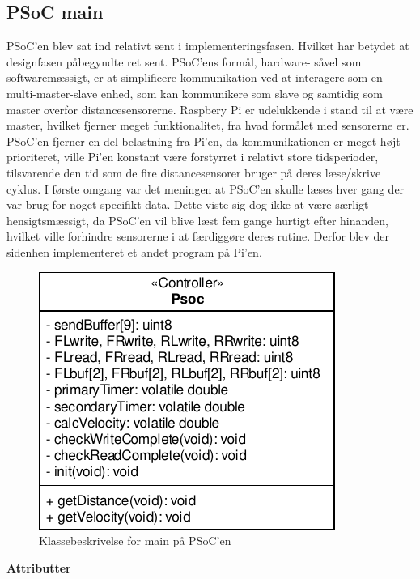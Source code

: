 \subsection{PSoC main} \label{sub:psoc_main}

PSoC'en blev sat ind relativt sent i implementeringsfasen. Hvilket har betydet at designfasen påbegyndte ret sent.
PSoC'ens formål, hardware- såvel som softwaremæssigt, er at simplificere \IIC kommunikation ved at interagere som en multi-master-slave enhed, som kan kommunikere som \IIC slave og samtidig som \IIC master overfor distancesensorerne. Raspbery Pi er udelukkende i stand til at være master, hvilket fjerner meget funktionalitet, fra hvad formålet med sensorerne er. PSoC'en fjerner en del belastning fra Pi'en, da \IIC kommunikationen er meget højt prioriteret, ville Pi'en konstant være forstyrret i relativt store tidsperioder, tilsvarende den tid som de fire distancesensorer bruger på deres læse/skrive cyklus. I første omgang var det meningen at PSoC'en skulle læses hver gang der var brug for noget specifikt data. Dette viste sig dog ikke at være særligt hensigtsmæssigt, da PSoC'en vil blive læst fem gange hurtigt efter hinanden, hvilket ville forhindre sensorerne i at færdiggøre deres rutine. Derfor blev der sidenhen implementeret et andet program på Pi'en. 

\begin{figure}[h]
\centering
\includegraphics[]{../fig/diagrammer/psoc/cd_psoc.pdf}
\caption{Klassebeskrivelse for main på PSoC'en}
\label{fig:cd_main_psoc}
\end{figure}

\clearpage

\textbf{Attributter}

